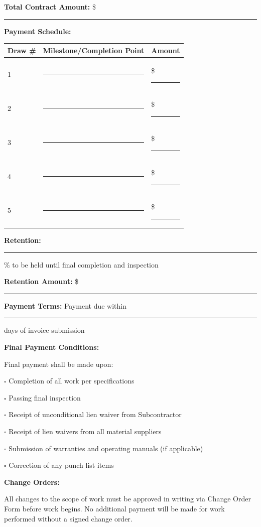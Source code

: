 \documentclass[11pt,letterpaper]{article}
\begin{document}
\textbf{Total Contract Amount:} \$ \rule{5cm}{0.4pt}

\textbf{Payment Schedule:}

\begin{tabular}{|p{1in}|p{3in}|p{1.5in}|}
\hline
\textbf{Draw \#} & \textbf{Milestone/Completion Point} & \textbf{Amount} \\
\hline
1 & \rule{2.5in}{0.4pt} & \$ \rule{1in}{0.4pt} \\
\hline
2 & \rule{2.5in}{0.4pt} & \$ \rule{1in}{0.4pt} \\
\hline
3 & \rule{2.5in}{0.4pt} & \$ \rule{1in}{0.4pt} \\
\hline
4 & \rule{2.5in}{0.4pt} & \$ \rule{1in}{0.4pt} \\
\hline
5 & \rule{2.5in}{0.4pt} & \$ \rule{1in}{0.4pt} \\
\hline
\end{tabular}

\vspace{6pt}

\textbf{Retention:} \rule{2cm}{0.4pt} \% to be held until final completion and inspection

\textbf{Retention Amount:} \$ \rule{5cm}{0.4pt}

\textbf{Payment Terms:} Payment due within \rule{2cm}{0.4pt} days of invoice submission

\vspace{6pt}

\textbf{Final Payment Conditions:}

Final payment shall be made upon:

$\square$ Completion of all work per specifications

$\square$ Passing final inspection

$\square$ Receipt of unconditional lien waiver from Subcontractor

$\square$ Receipt of lien waivers from all material suppliers

$\square$ Submission of warranties and operating manuals (if applicable)

$\square$ Correction of any punch list items

\vspace{6pt}

\textbf{Change Orders:}

All changes to the scope of work must be approved in writing via Change Order Form before work begins. No additional payment will be made for work performed without a signed change order.
\end{document}
